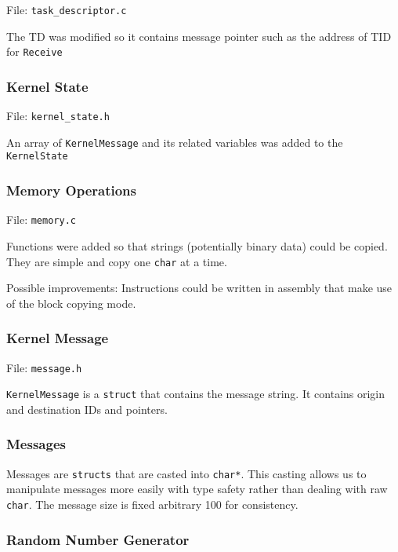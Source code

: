 \documentclass[letterpaper, 11pt]{article}
\begin{document}
File: \texttt{task\_descriptor.c}

The TD was modified so it contains message pointer such as the address of TID for \texttt{Receive}


\subsubsection{Kernel State%
  \label{kernel-state}%
}

File: \texttt{kernel\_state.h}

An array of \texttt{KernelMessage} and its related variables was added to the \texttt{KernelState}


\subsubsection{Memory Operations%
  \label{memory-operations}%
}

File: \texttt{memory.c}

Functions were added so that strings (potentially binary data) could be copied. They are simple and copy one \texttt{char} at a time.

Possible improvements: Instructions could be written in assembly that make use of the block copying mode.


\subsubsection{Kernel Message%
  \label{kernel-message}%
}

File: \texttt{message.h}

\texttt{KernelMessage} is a \texttt{struct} that contains the message string. It contains origin and destination IDs and pointers.


\subsubsection{Messages%
  \label{messages}%
}

Messages are \texttt{structs} that are casted into \texttt{char*}. This casting allows us to manipulate messages more easily with type safety rather than dealing with raw \texttt{char}. The message size is fixed arbitrary 100 for consistency.


\subsubsection{Random Number Generator%
  \label{random-number-generator}%
}
\end{document}
